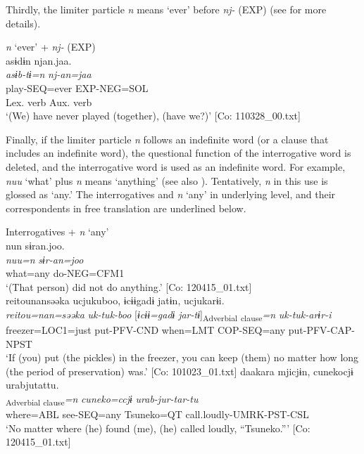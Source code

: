 Thirdly, the limiter particle \textit{n} means ‘ever’ before \textit{nj-} (EXP) (see  for more details).

\ea\label{ex:10.20}   \textit{n} ‘ever’ + \textit{nj-} (EXP)\\
  \gllll    asɨdɨn  njan.jaa.\\
    \textit{asɨb-tɨ=n}  \textit{nj{}-an=jaa}\\
    play-SEQ=ever  EXP-NEG=SOL\\
    {Lex. verb}  {Aux. verb}\\
   \glt ‘(We) have never played (together), (have we?)’ [Co: 110328\_00.txt]
\z

  Finally, if the limiter particle \textit{n} follows an indefinite word (or a clause that includes an indefinite word), the questional function of the interrogative word is deleted, and the interrogative word is used as an indefinite word. For example, \textit{nuu} ‘what’ plus \textit{n} means ‘anything’ (see also ). Tentatively, \textit{n} in this use is glossed as ‘any.’ The interrogatives and \textit{n} ‘any’ in underlying level, and their correspondents in free translation are underlined below.

\ea\label{ex:10.21}   Interrogatives + \textit{n} ‘any’\\
  \ea  %
      \glll    nun  sɨran.joo.\\
      \textit{nuu=n}  \textit{sɨr-an=joo}\\
      what=any  do-NEG=CFM1\\
      \glt       ‘(That person) did not do anything.’ [Co: 120415\_01.txt]
  \ex\relax [= (8-44 a)]\\
      \glll    {\textbar}reitou{\textbar}nansəəka  ucjukuboo,  ɨcɨɨgadɨ  jatɨn,  ucjukarɨi.\\
      \textit{reitou=nan=səəka}  \textit{uk-tuk-boo}  [\textit{ɨcɨɨ=gadɨ}  \textit{jar-tɨ}]\textsubscript{Adverbial} \textsubscript{clause}\textit{=n} \textit{uk-tuk-arɨr-i}\\
      freezer=LOC1=just  put-PFV-CND  when=LMT  COP-SEQ=any  put-PFV-CAP-NPST\\
      \glt       ‘If (you) put (the pickles) in the freezer, you can keep (them) no matter how long (the period of preservation) was.’ [Co: 101023\_01.txt]
  \ex  %
      \glll    daakara  mjicjɨn,  cunekocjɨ  urabjutattu.\\
      [\textit{daa=kara}  \textit{mj-tɨ}]\textsubscript{Adverbial clause}\textit{=n}  \textit{cuneko=ccjɨ}  \textit{urab-jur-tar-tu}\\
      where=ABL  see-SEQ=any  Tsuneko=QT  call.loudly-UMRK-PST-CSL\\
      \glt       ‘No matter where (he) found (me), (he) called loudly, “Tsuneko.”’ [Co: 120415\_01.txt]
    \z
\z

